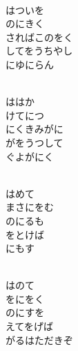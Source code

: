 \documentclass[10pt,b5j]{tarticle} %
\begin{document}
\begin{enumerate}
\begin{minipage}[c]{\blocksize}
        \vspace{\linespace}
        \item~\\
        はついを\\
        のにきく\\
        さればこのをく\\
        してをうちやし\\
        にゆにらん
        
    \end{minipage}
    \begin{minipage}[c]{\blocksize}
        
        \vspace{\linespace}
        \item~\\
        ははか\\
        けてにつ\\
        にくきみがに\\
        がをうつして\\
        ぐよがにく
        
    \end{minipage}
    \begin{minipage}[c]{\blocksize}
        
        \vspace{\linespace}
        \item~\\
        はめて\\
        まさにをむ\\
        のにるも\\
        をとけば\\
        にもす
        
    \end{minipage}
    \begin{minipage}[c]{\blocksize}
        
        \vspace{\linespace}
        \item~\\
        はのて\\
        をにをく\\
        のにすを\\
        えてをげば\\
        がるはただきぞ
    

\end{minipage}
\end{enumerate}
\end{document}
